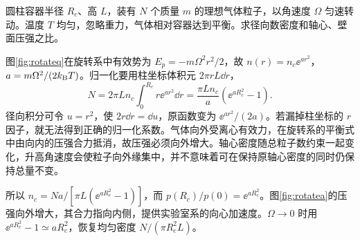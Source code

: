 \begin{exercise}[旋转容器内的气体分布]
圆柱容器半径 $R_c$、高 $L$，装有 $N$ 个质量 $m$ 的理想气体粒子，以角速度 $\Omega$ 匀速转动。温度 $T$ 均匀，忽略重力，气体相对容器达到平衡。求径向数密度和轴心、壁面压强之比。
\end{exercise}
\begin{solution}
图\ref{fig:rotateq}在旋转系中有效势为 $E_p=-m\Omega^2r^2/2$，故 $n(r)=n_c\ee^{ar^2}$，$a=m\Omega^2/(2k_{\mathrm B} T)$。归一化要用柱坐标体积元 $2\pi rL\dd r$，
\[
 N=2\pi Ln_c\int_0^{R_c}r\ee^{ar^2}\dd r
 =\frac{\pi Ln_c}{a}(\ee^{aR_c^2}-1).
\]
径向积分可令 $u=r^2$，使 $2r\dd r=\dd u$，原函数变为 $\ee^{ar^2}/(2a)$。若漏掉柱坐标的 $r$ 因子，就无法得到正确的归一化系数。气体向外受离心有效力，在旋转系的平衡式中由向内的压强合力抵消，故压强必须向外增大。轴心密度随总粒子数约束一起变化，升高角速度会使粒子向外缘集中，并不意味着可在保持原轴心密度的同时仍保持总量不变。

所以 $n_c=Na/[\pi L(\ee^{aR_c^2}-1)]$，而 $p(R_c)/p(0)=\ee^{aR_c^2}$。图\ref{fig:rotatea}的压强向外增大，其合力指向内侧，提供实验室系的向心加速度。$\Omega\to0$ 时用 $\ee^{aR_c^2}-1\simeq aR_c^2$，恢复均匀密度 $N/(\pi R_c^2L)$。
\end{solution}

